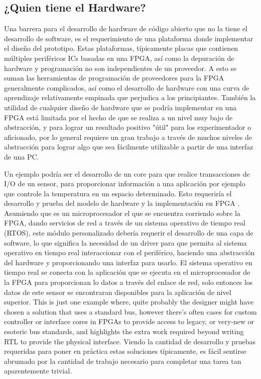 		\subsection{¿Quien tiene el Hardware?}

Una barrera para el desarrollo de hardware de código abierto que no la tiene el desarrollo de software, es el requerimiento de una plataforma donde implementar el diseño del prototipo. Estas plataformas, típicamente placas que contienen múltiples periféricos ICs basadas en una FPGA, así como la depuración de hardware y programación no son independientes de un proveedor. A esto se suman las herramientas de programación de proveedores para la FPGA generalmente complicados, así como el desarrollo de hardware con una curva de aprendizaje relativamente empinada que perjudica a los principiantes.
También  la utilidad de cualquier diseño de hardware que se podría implementar en una FPGA está limitada por el hecho de que se realiza a un nivel muy bajo de abstracción, y para lograr un resultado positivo "útil" para los experimentador o aficionado, por lo general requiere un gran trabajo a través de muchos niveles de abstracción para lograr algo que sea fácilmente utilizable a partir de una interfaz de una PC. 

Un ejemplo podría ser el desarrollo de un core para que realice transacciones de I/O de un sensor, para proporcionar información a una aplicación por ejemplo que controle la temperatura en un espacio determinado. Esto requeriría el desarrollo y prueba del modelo de hardware y la implementación en FPGA . Asumiendo que es un microprocesador el que se encuentra corriendo sobre la FPGA, dando servicios de red a través de un sistema operativo de tiempo real (RTOS), este módulo personalizado debería requerir el desarrollo de una capa de software, lo que significa la necesidad de un driver para que permita al sistema operativo en tiempo real interaccionar con el periférico, haciendo una abstracción del hardware y proporcionando una interfaz para usarlo. El sistema operativo en tiempo real se conecta con la aplicación que se ejecuta en el microprocesador de la FPGA para proporcionan lo datos a través del enlace de red, solo entonces los datos de este sensor se encontraran disponibles para la aplicación de nivel superior. This is just one example where, quite probably the designer might have chosen a solution that uses a standard bus, however there’s often cases for custom controller or interface cores in FPGAs to provide
access to legacy, or very-new or esoteric bus standards, and highlights the extra work required beyond writing RTL to provide the physical interface.
Viendo la cantidad de desarrollo y pruebas requeridas para poner en práctica estas soluciones típicamente, es fácil sentirse abrumado por la cantidad de trabajo necesario para completar una tarea tan aparentemente trivial.

